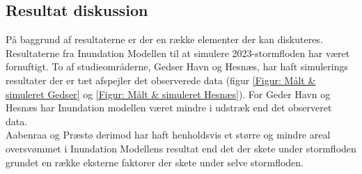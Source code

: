 


\subsection{Resultat diskussion}

På baggrund af resultaterne er der en række elementer der kan diskuteres. Resultaterne fra Inundation Modellen til at simulere 2023-stormfloden har været fornuftigt. To af studieområderne, Gedser Havn og Hesnæs, har haft simulerings resultater der er tæt afspejler det observerede data (figur \ref{Figur: Målt & simuleret Gedser} og \ref{Figur: Målt & simuleret Hesnæs}). For Geder Havn og Hesnæs har Inundation modellen været mindre i udstræk end det observeret data. \\
Aabenraa og Præstø derimod har haft henholdsvis et større og mindre areal oversvømmet i Inundation Modellens resultat end det der skete under stormfloden grundet en række eksterne faktorer der skete under selve stormfloden.\\

